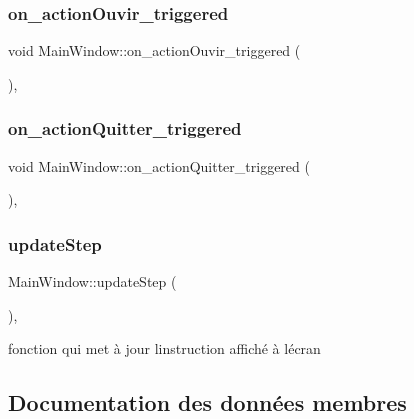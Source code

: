\subsubsection{\texorpdfstring{on\+\_\+action\+Ouvir\+\_\+triggered}{on\_actionOuvir\_triggered}}
{\footnotesize\ttfamily void Main\+Window\+::on\+\_\+action\+Ouvir\+\_\+triggered (\begin{DoxyParamCaption}{ }\end{DoxyParamCaption})\hspace{0.3cm}{\ttfamily [private]}, {\ttfamily [slot]}}

\mbox{\label{classMainWindow_afe9d9d46e61e2460e636619577a9e8fd}} 
\subsubsection{\texorpdfstring{on\+\_\+action\+Quitter\+\_\+triggered}{on\_actionQuitter\_triggered}}
{\footnotesize\ttfamily void Main\+Window\+::on\+\_\+action\+Quitter\+\_\+triggered (\begin{DoxyParamCaption}{ }\end{DoxyParamCaption})\hspace{0.3cm}{\ttfamily [private]}, {\ttfamily [slot]}}

\mbox{\label{classMainWindow_a344d21527850380c306fe7ac165321bd}} 
\subsubsection{\texorpdfstring{update\+Step}{updateStep}}
{\footnotesize\ttfamily Main\+Window\+::update\+Step (\begin{DoxyParamCaption}{ }\end{DoxyParamCaption})\hspace{0.3cm}{\ttfamily [private]}, {\ttfamily [slot]}}



fonction qui met à jour l\textquotesingle{}instruction affiché à l\textquotesingle{}écran 



\subsection{Documentation des données membres}
\mbox{\label{classMainWindow_aa7fb75eed49d7eaa019f64577fa11b05}} 

